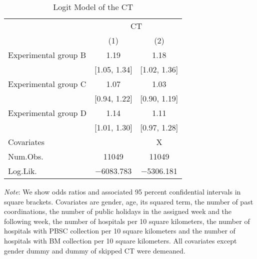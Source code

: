 \documentclass[12pt, a4paper]{article}
\begin{document}
\begin{table}[H]

\caption{\label{tab:logit-test}Logit Model of the CT}
\centering
\fontsize{8}{10}\selectfont
\begin{threeparttable}
\begin{tabular}[t]{>{\raggedright\arraybackslash}p{20em}cc}
\toprule
\multicolumn{1}{c}{ } & \multicolumn{2}{c}{CT} \\
\cmidrule(l{3pt}r{3pt}){2-3}
  & (1) & (2)\\
\midrule
Experimental group B & \num{1.19} & \num{1.18}\\
 & {}[\num{1.05}, \num{1.34}] & {}[\num{1.02}, \num{1.36}]\\
Experimental group C & \num{1.07} & \num{1.03}\\
 & {}[\num{0.94}, \num{1.22}] & {}[\num{0.90}, \num{1.19}]\\
Experimental group D & \num{1.14} & \num{1.11}\\
 & {}[\num{1.01}, \num{1.30}] & {}[\num{0.97}, \num{1.28}]\\
\midrule
Covariates &  & X\\
Num.Obs. & \num{11049} & \num{11049}\\
Log.Lik. & \num{-6083.783} & \num{-5306.181}\\
\bottomrule
\end{tabular}
\begin{tablenotes}
\item \emph{Note}: We show odds ratios and associated 95 percent confidential intervals in square brackets. Covariates are gender, age, its squared term, the number of past coordinations, the number of public holidays in the assigned week and the following week, the number of hospitals per 10 square kilometers, the number of hospitals with PBSC collection per 10 square kilometers and the number of hospitals with BM collection per 10 square kilometers. All covariates except gender dummy and dummy of skipped CT were demeaned.
\end{tablenotes}
\end{threeparttable}
\end{table}
\end{document}
